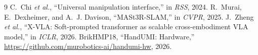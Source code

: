 \documentclass[conference,10pt]{IEEEtran}
\begin{document}
\begin{thebibliography}{9}\footnotesize
{} C.~Chi \emph{et al.}, ``Universal manipulation interface,'' in \emph{RSS}, 2024.
 R.~Murai, E.~Dexheimer, and A.~J. Davison, ``MASt3R-SLAM,'' in \emph{CVPR}, 2025.
 J.~Zheng \emph{et al.}, ``X-VLA: Soft-prompted transformer as scalable cross-embodiment VLA model,'' in \emph{ICLR}, 2026.
 BrikHMP18, ``HandUMI: Hardware,'' \url{https://github.com/murobotics-ai/handumi-hw}, 2026.
\end{thebibliography}
\end{document}
